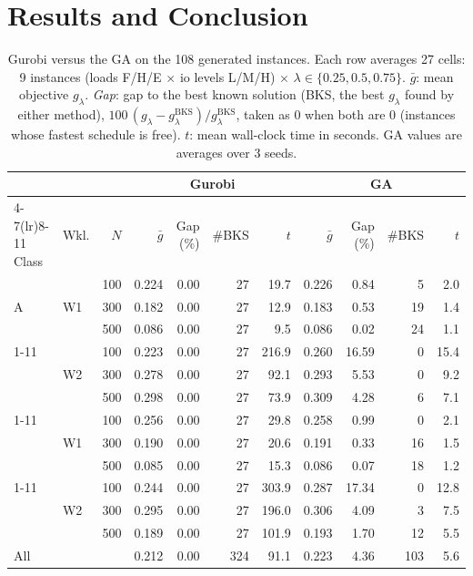 \documentclass[conference]{IEEEtran}
\begin{document}
\section{Results and Conclusion}
\label{sec:results}

\begin{table}[t]
\centering\footnotesize
\setlength{\tabcolsep}{5pt}
\caption{Gurobi versus the GA on the 108 generated instances. Each row averages 27
cells: 9 instances (loads F/H/E $\times$ io levels L/M/H) $\times$
$\lambda\in\{0.25,0.5,0.75\}$. $\bar g$: mean objective $g_\lambda$. \emph{Gap}: gap to
the best known solution (BKS, the best $g_\lambda$ found by either method),
$100\,(g_\lambda-g_\lambda^{\mathrm{BKS}})/g_\lambda^{\mathrm{BKS}}$, taken as 0
when both are 0 (instances whose fastest schedule is free). $t$: mean
wall-clock time in seconds. GA values are averages over 3 seeds.}
\label{tab:ga-vs-gurobi}
\begin{tabular}{llrrrrrrrrr}
\toprule
 & & & \multicolumn{4}{c}{Gurobi} & \multicolumn{4}{c}{GA} \\
\cmidrule(lr){4-7}\cmidrule(lr){8-11}
Class & Wkl. & $N$ & $\bar g$ & Gap (\%) & \#BKS & $t$ & $\bar g$ & Gap (\%) & \#BKS & $t$ \\
\midrule
\multirow{3}{*}{A} & \multirow{3}{*}{W1} & 100 & 0.224 & 0.00 & 27 & 19.7 & 0.226 & 0.84 & 5 & 2.0 \\
 &  & 300 & 0.182 & 0.00 & 27 & 12.9 & 0.183 & 0.53 & 19 & 1.4 \\
 &  & 500 & 0.086 & 0.00 & 27 & 9.5 & 0.086 & 0.02 & 24 & 1.1 \\
\cmidrule(lr){1-11}
\multirow{3}{*}{A} & \multirow{3}{*}{W2} & 100 & 0.223 & 0.00 & 27 & 216.9 & 0.260 & 16.59 & 0 & 15.4 \\
 &  & 300 & 0.278 & 0.00 & 27 & 92.1 & 0.293 & 5.53 & 0 & 9.2 \\
 &  & 500 & 0.298 & 0.00 & 27 & 73.9 & 0.309 & 4.28 & 6 & 7.1 \\
\cmidrule(lr){1-11}
\multirow{3}{*}{B} & \multirow{3}{*}{W1} & 100 & 0.256 & 0.00 & 27 & 29.8 & 0.258 & 0.99 & 0 & 2.1 \\
 &  & 300 & 0.190 & 0.00 & 27 & 20.6 & 0.191 & 0.33 & 16 & 1.5 \\
 &  & 500 & 0.085 & 0.00 & 27 & 15.3 & 0.086 & 0.07 & 18 & 1.2 \\
\cmidrule(lr){1-11}
\multirow{3}{*}{B} & \multirow{3}{*}{W2} & 100 & 0.244 & 0.00 & 27 & 303.9 & 0.287 & 17.34 & 0 & 12.8 \\
 &  & 300 & 0.295 & 0.00 & 27 & 196.0 & 0.306 & 4.09 & 3 & 7.5 \\
 &  & 500 & 0.189 & 0.00 & 27 & 101.9 & 0.193 & 1.70 & 12 & 5.5 \\
\midrule
\multicolumn{3}{l}{All} & 0.212 & 0.00 & 324 & 91.1 & 0.223 & 4.36 & 103 & 5.6 \\
\bottomrule
\end{tabular}
\end{table}
\end{document}
